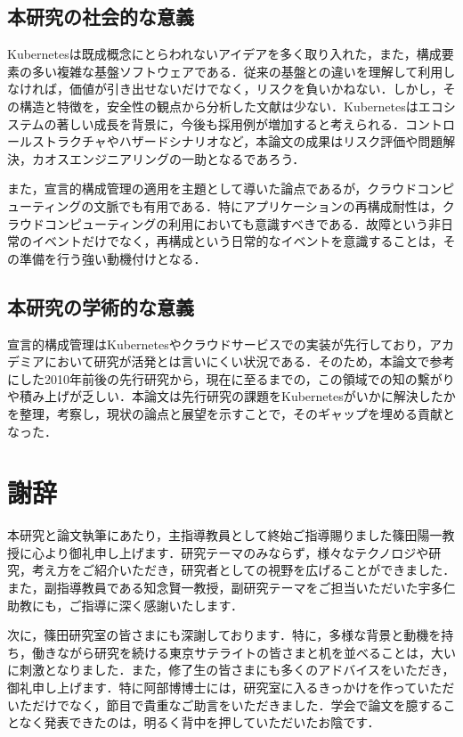 \documentclass[12pt,a4j]{ujreport}
\begin{document}
\section{本研究の社会的な意義}
Kubernetesは既成概念にとらわれないアイデアを多く取り入れた，また，構成要素の多い複雑な基盤ソフトウェアである．従来の基盤との違いを理解して利用しなければ，価値が引き出せないだけでなく，リスクを負いかねない．しかし，その構造と特徴を，安全性の観点から分析した文献は少ない．Kubernetesはエコシステムの著しい成長を背景に，今後も採用例が増加すると考えられる．コントロールストラクチャやハザードシナリオなど，本論文の成果はリスク評価や問題解決，カオスエンジニアリングの一助となるであろう．

また，宣言的構成管理の適用を主題として導いた論点であるが，クラウドコンピューティングの文脈でも有用である．特にアプリケーションの再構成耐性は，クラウドコンピューティングの利用においても意識すべきである．故障という非日常のイベントだけでなく，再構成という日常的なイベントを意識することは，その準備を行う強い動機付けとなる．

\section{本研究の学術的な意義}
宣言的構成管理はKubernetesやクラウドサービスでの実装が先行しており，アカデミアにおいて研究が活発とは言いにくい状況である．そのため，本論文で参考にした2010年前後の先行研究から，現在に至るまでの，この領域での知の繫がりや積み上げが乏しい．本論文は先行研究の課題をKubernetesがいかに解決したかを整理，考察し，現状の論点と展望を示すことで，そのギャップを埋める貢献となった．

\chapter*{謝辞}
本研究と論文執筆にあたり，主指導教員として終始ご指導賜りました篠田陽一教授に心より御礼申し上げます．研究テーマのみならず，様々なテクノロジや研究，考え方をご紹介いただき，研究者としての視野を広げることができました．また，副指導教員である知念賢一教授，副研究テーマをご担当いただいた宇多仁助教にも，ご指導に深く感謝いたします．

次に，篠田研究室の皆さまにも深謝しております．特に，多様な背景と動機を持ち，働きながら研究を続ける東京サテライトの皆さまと机を並べることは，大いに刺激となりました．また，修了生の皆さまにも多くのアドバイスをいただき，御礼申し上げます．特に阿部博博士には，研究室に入るきっかけを作っていただいただけでなく，節目で貴重なご助言をいただきました．学会で論文を臆することなく発表できたのは，明るく背中を押していただいたお陰です．
\end{document}
